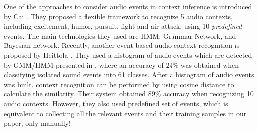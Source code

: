 One of the approaches to consider audio events in context inference is introduced 
by Cai \et\cite{1621215}. They proposed a flexible framework to recognize 5 
audio contexts, including excitement, humor, pursuit, fight and air-attack, 
using 10 {\em predefined} events. The main technologies they used are HMM, 
Grammar Network, and Bayesian network. 
Recently, another event-based audio context recognition is proposed by 
Heittola \et\cite{heittola2010audio}. They used a histogram of audio events which 
are detected by GMM/HMM presented in \cite{mesaros2010acoustic}, 
where an accuracy of $24\%$ was obtained when classifying isolated sound events 
into 61 classes. After a histogram of audio events was built, 
context recognition can be performed by using cosine distance to 
calculate the similarity. 
Their system obtained $89\%$ accuracy when recognizing 10 audio contexts. 
However, they also used predefined set of events, which is equivalent to 
collecting all the relevant events and their training samples 
in our paper, only manually!

